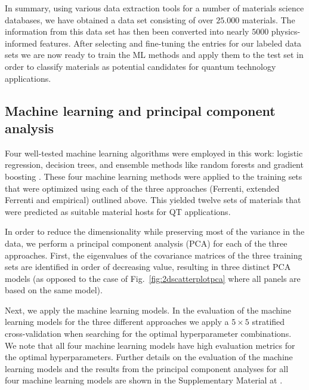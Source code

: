 \documentclass[superscriptaddress,unsortedaddress,
 amsmath,amssymb,
 aps,
]{revtex4-2}
\begin{document}
In summary, using various data extraction tools for a number of materials science databases, we have obtained a data set consisting of over $25.000$ materials. The information from this data set has then been converted into nearly $5000$ physics-informed features.  
After selecting and fine-tuning the entries for our labeled data sets we are now ready to train the ML methods and apply them to the test set in order to classify materials as potential candidates for quantum technology applications. 

\subsection*{Machine learning and principal component analysis}

Four well-tested machine learning algorithms were employed in this work: logistic regression, decision trees, and ensemble methods like random forests and gradient boosting \cite{Mehta2019,Hastie2009}. 
These four machine learning methods were applied to the training sets that were optimized using each of the three approaches (Ferrenti, extended Ferrenti and empirical) outlined above. This yielded twelve sets of materials that were predicted as suitable material hosts for QT applications.  

In order to reduce the dimensionality while preserving most of the variance in the data,
we perform a principal component analysis (PCA) for each of the three approaches.
First, the eigenvalues of the covariance matrices of the three training sets are identified in order of decreasing value,  resulting in three distinct PCA models (as opposed to the case of Fig.~\ref{fig:2dscatterplotpca} where all panels are based on the same model). 

Next, we apply the machine learning models. In the evaluation of the machine learning models for the three different approaches we apply a $5\times 5$ stratified cross-validation when searching for the optimal hyperparameter combinations. We note that all four machine learning models have high evaluation metrics for the optimal hyperparameters. Further details on the evaluation of the machine learning models and the results from the principal component analyses for all four machine learning models are shown in the Supplementary Material at \cite{supplementary}. 
\end{document}
